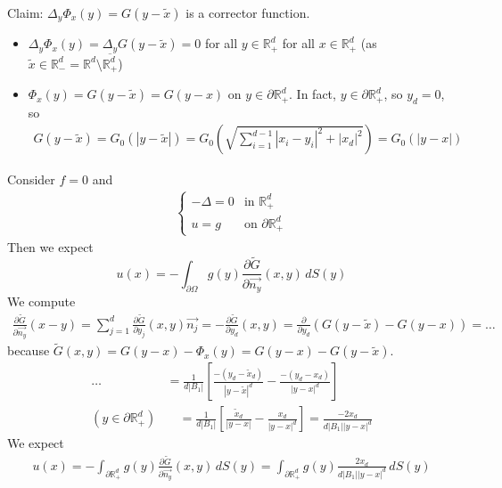 \documentclass{report}
\theoremstyle{tommy}
\begin{document}
  Claim: \(\Delta_y \Phi_x(y) = G(y - \tilde x)\) is a corrector function.
  \begin{itemize}
    \item \(\Delta_y \Phi_x(y) = \Delta_y G(y-\tilde x) = 0\) for all \(y \in \mathbb{R}_+^d\) for all \(x \in \mathbb{R}_+^d\) (as \(\tilde x \in \mathbb{R}_-^d = \mathbb{R}^d \setminus \overline{\mathbb{R}_+^d}\))
    \item \(\Phi_x(y) = G(y-\tilde x) = G(y-x)\) on \(y \in \partial \mathbb{R}_+^d\). In fact, \(y \in \partial \mathbb{R}_+^d\), so \(y_d = 0\), so 
    \begin{align*}
      G(y - \tilde x) = G_0(|y-\tilde x|) = G_0\left(\sqrt{\sum_{i=1}^{d-1} |x_i - y_i|^2 +|x_d|^2}\right) = G_0(|y-x|)
    \end{align*}
  \end{itemize}
  Consider \(f = 0\) and 
  \begin{align*}
    \begin{cases}
      - \Delta = 0 &\text{in } \mathbb{R}_+^d \\ u = g & \text{on } \partial \mathbb{R}_+^d
    \end{cases}
  \end{align*}
  Then we expect \[u(x) = - \int_{\partial \Omega} g(y) \frac{\partial \tilde G}{\partial \vec{n_y}}(x,y) \, dS(y)\]
  We compute
  \begin{align*}
    \frac{\partial \tilde G}{\partial \vec{n_y}}(x-y) = \sum_{j=1}^d \frac{\partial \tilde G}{\partial y_j}(x,y) \vec{n_j} = - \frac{\partial \tilde G}{\partial y_d}(x,y) = \frac{\partial }{\partial y_d}(G(y-\tilde x) - G(y-x)) = \dots
  \end{align*}
  because \(\tilde G(x,y) = G(y-x) - \Phi_x(y) = G(y-x) - G(y-\tilde x)\). 
  \begin{align*}
    \dots &= \frac{1}{d |B_1|} \left[\frac{-(y_d - \tilde x_d)}{|y-\tilde x|^d} - \frac{-(y_d-x_d)}{|y-x|^d}\right] \\
    (y \in \partial \mathbb{R}_+^d) &\quad= \frac{1}{d|B_1|} \left[\frac{\tilde x_d}{|y-x|} - \frac{x_d}{|y-x|^d}\right]
    = \frac{- 2 x_d}{d |B_1| |y-x|^d}
  \end{align*}
  We expect
  \begin{align*}
    u(x) = - \int_{\partial \mathbb{R}_+^d} g(y) \frac{\partial \tilde G}{\partial \vec{n_y}} (x,y) \, dS(y) = \int_{\partial \mathbb{R}_+^d} g(y) \frac{2x_d}{d |B_1| |y-x|^d} \, dS(y)
  \end{align*}
  
\end{document}
